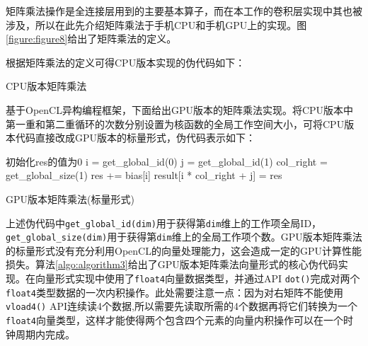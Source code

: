 矩阵乘法操作是全连接层用到的主要基本算子，而在本工作的卷积层实现中其也被涉及，所以在此先介绍矩阵乘法于手机CPU和手机GPU上的实现。图\ref{figure:figure8}给出了矩阵乘法的定义。

根据矩阵乘法的定义可得CPU版本实现的伪代码如下：

\begin{algorithm}[htbp]
	\small
	\SetAlgoLined
    \begin{spacing}{0.9}
    \end{spacing}
	\caption{CPU版本矩阵乘法}
	\label{algo:algorithm1}
\end{algorithm}

基于OpenCL异构编程框架，下面给出GPU版本的矩阵乘法实现。将CPU版本中第一重和第二重循环的次数分别设置为核函数的全局工作空间大小，可将CPU版本代码直接改成GPU版本的标量形式，伪代码表示如下：

\begin{algorithm}[htbp]
	\small
	\SetAlgoLined
    \begin{spacing}{0.9}
    初始化res的值为0\;
	i = get\_global\_id(0)\;
	j = get\_global\_id(1)\;
	col\_right = get\_global\_size(1)\;
    res += bias[i]\;
	result[i * col\_right + j] = res\;
    \end{spacing}
	\caption{GPU版本矩阵乘法(标量形式)}
	\label{algo:algorithm2}
\end{algorithm}

上述伪代码中\texttt{get\_global\_id(dim)}用于获得第\texttt{dim}维上的工作项全局ID，\texttt{get\_global\_size(dim)}用于获得第\texttt{dim}维上的全局工作项个数。GPU版本矩阵乘法的标量形式没有充分利用OpenCL的向量处理能力，这会造成一定的GPU计算性能损失。算法\ref{algo:algorithm3}给出了GPU版本矩阵乘法向量形式的核心伪代码实现。在向量形式实现中使用了\texttt{float4}向量数据类型，并通过API \texttt{dot()}完成对两个\texttt{float4}类型数据的一次内积操作。此处需要注意一点：因为对右矩阵不能使用\texttt{vload4()} API连续读4个数据,所以需要先读取所需的4个数据再将它们转换为一个\texttt{float4}向量类型，这样才能使得两个包含四个元素的向量内积操作可以在一个时钟周期内完成。

